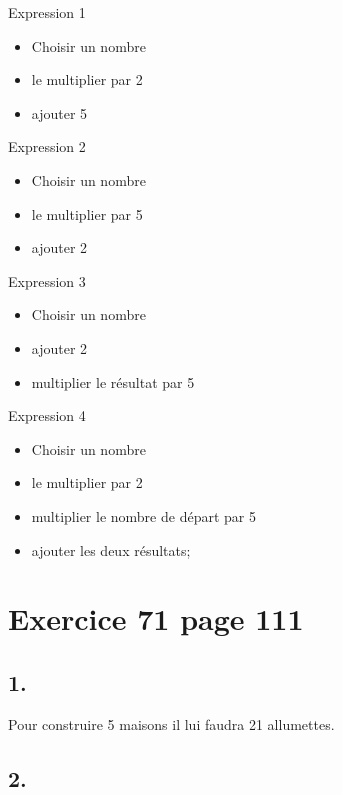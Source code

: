 \documentclass[12pt,a4paper]{article}
\begin{document}
\begin{multicols}{2}
	Expression 1
	\begin{itemize}
		\item Choisir un nombre
		\item le multiplier par 2
		\item ajouter 5
	\end{itemize}
	
	\vspace*{0.5cm}
		
	Expression 2
	\begin{itemize}
		\item Choisir un nombre
		\item le multiplier par 5
		\item ajouter 2
	\end{itemize}

	\vspace*{0.5cm}
	
	Expression 3
	\begin{itemize}
		\item Choisir un nombre
		\item ajouter 2
		\item multiplier le résultat par 5
	\end{itemize}
	
	\vspace*{0.5cm}
	
	Expression 4
	\begin{itemize}
		\item Choisir un nombre
		\item le multiplier par 2
		\item multiplier le nombre de départ par 5
		\item ajouter les deux résultats;
	\end{itemize}
\end{multicols}


\section*{Exercice 71 page 111}

\subsection*{1.}

Pour construire 5 maisons il lui faudra 21 allumettes.

\subsection*{2.}
\end{document}
